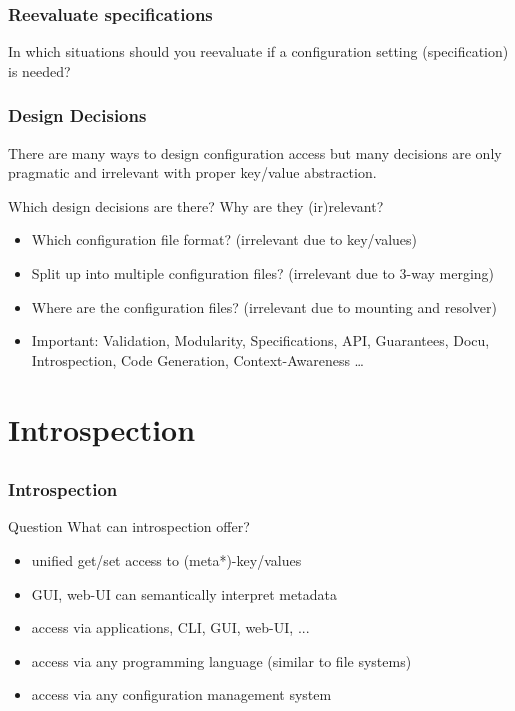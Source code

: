 \begin{frame}
	\frametitle{Reevaluate specifications}

	In which situations should you reevaluate if a configuration setting (specification) is needed?

\end{frame}

\begin{frame}
	\frametitle{Design Decisions}

	There are many ways to design configuration access but many decisions are only pragmatic and irrelevant with proper key/value abstraction.

	\begin{task}
	Which design decisions are there?
	Why are they (ir)relevant?
	\end{task}

	\pause

	\begin{itemize}[<+->]
	\item Which configuration file format? (irrelevant due to key/values)
	\item Split up into multiple configuration files? (irrelevant due to 3-way merging)
	\item Where are the configuration files? (irrelevant due to mounting and resolver)
	\item Important: Validation, Modularity, Specifications, API, Guarantees, Docu, Introspection, Code Generation, Context-Awareness  \dots
	\end{itemize}
\end{frame}






\section{Introspection}

\subsection{}

\begin{frame}
	\frametitle{Introspection}
	\begin{alertblock}{Question}
	What can introspection offer?
	\end{alertblock}

	\pause
	\begin{itemize}
	\item unified get/set access to (meta*)-key/values
	\item GUI, web-UI can semantically interpret metadata
	\item access via applications, CLI, GUI, web-UI, ...
	\item access via any programming language (similar to file systems)
	\item access via any configuration management system
	\end{itemize}
\end{frame}

